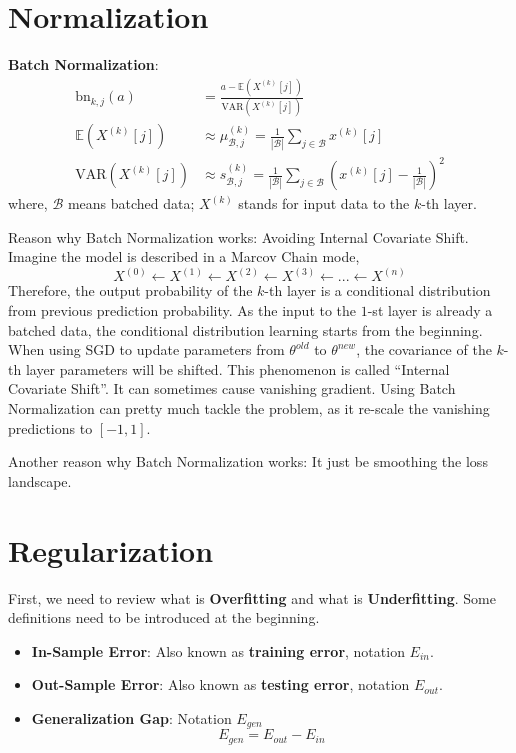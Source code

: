 \documentclass[a4paper]{article}
\begin{document}
\section{Normalization}

\textbf{Batch Normalization}: 
\begin{align}
	\text{bn}_{k, j} (a) &= \frac{a - \mathbb{E} (X^{(k)}[j])}{\text{VAR} (X^{(k)}[j])} \\
	\mathbb{E} (X^{(k)}[j]) &\approx \mu_{\mathcal{B}, j}^{(k)} = \frac{1}{|\mathcal{B}|} \sum_{j \in \mathcal{B}} x^{(k)}[j] \\
	\text{VAR} (X^{(k)}[j]) &\approx s_{\mathcal{B}, j}^{(k)} = \frac{1}{|\mathcal{B}|} \sum_{j \in \mathcal{B}} (x^{(k)}[j] - \frac{1}{|\mathcal{B}|})^2
\end{align}
where, $\mathcal{B}$ means batched data; $X^{(k)}$ stands for input data to the $k$-th layer.

Reason why Batch Normalization works: Avoiding Internal Covariate Shift. Imagine the model is described in a Marcov Chain mode,
\begin{equation}
	X^{(0)} \leftarrow X^{(1)} \leftarrow X^{(2)} \leftarrow X^{(3)} \leftarrow ... \leftarrow X^{(n)}
\end{equation}
Therefore, the output probability of the $k$-th layer is a conditional distribution from previous prediction probability. As the input to the $1$-st layer is already a batched data, the conditional distribution learning starts from the beginning. When using SGD to update parameters from $\theta^{old}$ to $\theta^{new}$, the covariance of the $k$-th layer parameters will be shifted. This phenomenon is called ``Internal Covariate Shift''. It can sometimes cause vanishing gradient. Using Batch Normalization can pretty much tackle the problem, as it re-scale the vanishing predictions to $[-1, 1]$.

Another reason why Batch Normalization works: It just be smoothing the loss landscape.
 
\section{Regularization}

First, we need to review what is \textbf{Overfitting} and what is \textbf{Underfitting}. Some definitions need to be introduced at the beginning.
\begin{itemize}
	\item \textbf{In-Sample Error}: Also known as \textbf{training error}, notation $E_{in}$.
	\item \textbf{Out-Sample Error}: Also known as \textbf{testing error}, notation $E_{out}$.
	\item \textbf{Generalization Gap}: Notation $E_{gen}$
	\begin{equation}
		E_{gen} = E_{out} - E_{in}
	\end{equation}
\end{itemize}
\end{document}
